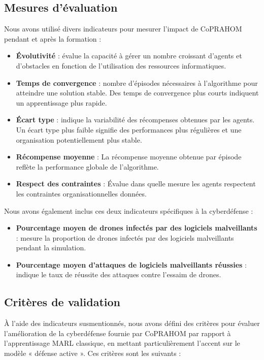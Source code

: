 \subsection{Mesures d'évaluation}

Nous avons utilisé divers indicateurs pour mesurer l'impact de CoPRAHOM pendant et après la formation :
\begin{itemize}
  \item \textbf{Évolutivité} : évalue la capacité à gérer un nombre croissant d'agents et d'obstacles en fonction de l'utilisation des ressources informatiques.
  \item \textbf{Temps de convergence} : nombre d'épisodes nécessaires à l'algorithme pour atteindre une solution stable. Des temps de convergence plus courts indiquent un apprentissage plus rapide.
  \item \textbf{Écart type} : indique la variabilité des récompenses obtenues par les agents. Un écart type plus faible signifie des performances plus régulières et une organisation potentiellement plus stable.
  \item \textbf{Récompense moyenne} : La récompense moyenne obtenue par épisode reflète la performance globale de l'algorithme.
  \item \textbf{Respect des contraintes} : Évalue dans quelle mesure les agents respectent les contraintes organisationnelles données. %
\end{itemize}

Nous avons également inclus ces deux indicateurs spécifiques à la cyberdéfense :
\begin{itemize}
  \item \textbf{Pourcentage moyen de drones infectés par des logiciels malveillants} : mesure la proportion de drones infectés par des logiciels malveillants pendant la simulation.
  \item \textbf{Pourcentage moyen d'attaques de logiciels malveillants réussies} : indique le taux de réussite des attaques contre l'essaim de drones.
\end{itemize}

\subsection{Critères de validation}

À l'aide des indicateurs susmentionnés, nous avons défini des critères pour évaluer l'amélioration de la cyberdéfense fournie par CoPRAHOM par rapport à l'apprentissage MARL classique, en mettant particulièrement l'accent sur le modèle « défense active ». Ces critères sont les suivants :

